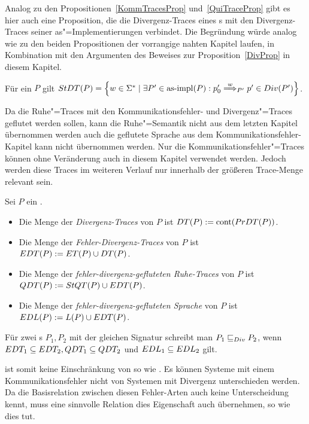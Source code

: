 Analog zu den Propositionen~\ref{KommTracesProp} und~\ref{QuiTraceProp} gibt es
hier auch eine Proposition, die die Divergenz-Traces eines \MEIO{}s mit den
Divergenz-Traces seiner as"=Implementierungen verbindet. Die Begründung würde
analog wie zu den beiden Propositionen der vorrangige nahten Kapitel laufen, in
Kombination mit den Argumenten des Beweises zur Proposition~\ref{DivProp} in
diesem Kapitel.

\begin{Prop}
  Für ein \MEIO{} $P$ gilt $\StDT (P) = \left\{w\in\Sigma ^*\mid \exists P' \in
  \asimp (P): p'_0\weakmust[w]_{P'} p'\in Div(P')\right\}$.
\end{Prop}

Da die Ruhe"=Traces mit den Kommunikationsfehler- und Divergenz"=Traces
geflutet werden sollen, kann die Ruhe"=Semantik nicht aus dem letzten Kapitel
übernommen werden auch die geflutete Sprache aus dem
Kommunikationsfehler-Kapitel kann nicht übernommen werden. Nur die
Kommunikationsfehler"=Traces \ET{} können ohne Veränderung auch in diesem
Kapitel verwendet werden. Jedoch werden diese Traces im weiteren Verlauf nur
innerhalb der größeren Trace-Menge \EDT{} relevant sein.

\begin{Def}
  \label{DivSemDef}
  Sei $P$ ein \MEIO{}.
  \begin{itemize}
    \item Die Menge der \emph{Divergenz-Traces} von $P$ ist $DT (P) := \mathrm{cont}
      (PrDT (P))$.
    \item Die Menge der \emph{Fehler-Divergenz-Traces} von $P$ ist $EDT (P) :=
      ET (P)\cup DT (P)$.
    \item Die Menge der \emph{fehler-divergenz-gefluteten Ruhe-Traces} von $P$
      ist $QDT (P) := StQT (P)\cup EDT (P)$.
    \item Die Menge der \emph{fehler-divergenz-gefluteten Sprache} von $P$ ist
      $EDL (P) := L(P)\cup EDT (P)$.
  \end{itemize}
  Für zwei \MEIO{}s $P_1,P_2$ mit der gleichen Signatur schreibt man $P_1 \sqsubseteq  _{Div}
  P_2$, wenn $EDT _1\subseteq EDT _2, QDT _1\subseteq QDT _2$ und $EDL
  _1\subseteq EDL _2$ gilt.
\end{Def}

\DRel{} ist somit keine Einschränkung von \ERel{} so wie \QRel{}. Es können
Systeme mit einem Kommunikationsfehler nicht von Systemen mit Divergenz
unterschieden werden. Da die Basisrelation zwischen diesen Fehler-Arten auch
keine Unterscheidung kennt, muss eine sinnvolle Relation dies Eigenschaft auch
übernehmen, so wie \DRel{} dies tut.

